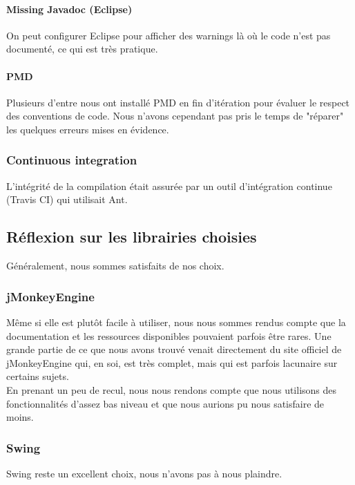 	\paragraph{Missing Javadoc (Eclipse)}
	On peut configurer Eclipse pour afficher des warnings là où le code n'est
	pas documenté, ce qui est très pratique.

	\paragraph{PMD}
	Plusieurs d'entre nous ont installé PMD en fin d'itération pour évaluer le
	respect des conventions de code. Nous n'avons cependant pas pris le temps
	de "réparer" les quelques erreurs mises en évidence.

	\subsubsection{Continuous integration}
	L'intégrité de la compilation était assurée par un outil d'intégration 
	continue (Travis CI) qui utilisait Ant.

\subsection{Réflexion sur les librairies choisies}

	Généralement, nous sommes satisfaits de nos choix.

	\subsubsection{jMonkeyEngine}
	Même si elle est plutôt facile à utiliser, nous nous sommes rendus compte
	que la documentation et les ressources disponibles pouvaient parfois être
	rares. Une grande partie de ce que nous avons trouvé venait directement 
	du site officiel de jMonkeyEngine qui, en soi, est très complet, mais qui
	est parfois lacunaire sur certains sujets.\\

	En prenant un peu de recul, nous nous rendons compte que nous utilisons
	des fonctionnalités d'assez bas niveau et que nous aurions pu nous 
	satisfaire de moins.

	\subsubsection{Swing}
	Swing reste un excellent choix, nous n'avons pas à nous plaindre.

